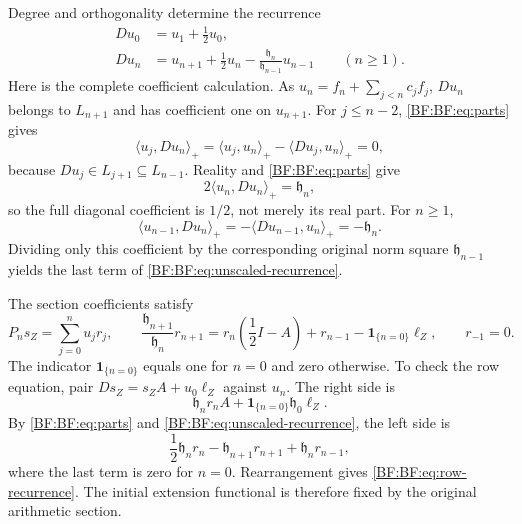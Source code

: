 Degree and orthogonality determine the recurrence
\begin{equation}
\begin{split}
Du_0&=u_1+\frac12u_0,\\
Du_n&=u_{n+1}+\frac12u_n
          -\frac{\mathfrak h_n}{\mathfrak h_{n-1}}u_{n-1}
          \qquad(n\ge1).
\end{split}
\tag{BF.14}\label{BF:BF:eq:unscaled-recurrence}
\end{equation}
Here is the complete coefficient calculation.  As
\(u_n=f_n+\sum_{j<n}c_jf_j\), \(Du_n\) belongs to \(L_{n+1}\)
and has coefficient one on \(u_{n+1}\).
For \(j\le n-2\), \eqref{BF:BF:eq:parts} gives
\[
\langle u_j,Du_n\rangle_+
=\langle u_j,u_n\rangle_+-\langle Du_j,u_n\rangle_+=0,
\]
because \(Du_j\in L_{j+1}\subseteq L_{n-1}\).
Reality and \eqref{BF:BF:eq:parts} give
\[
2\langle u_n,Du_n\rangle_+=\mathfrak h_n,
\]
so the full diagonal coefficient is \(1/2\), not merely its real
part.  For \(n\ge1\),
\[
\langle u_{n-1},Du_n\rangle_+
=-\langle Du_{n-1},u_n\rangle_+=-\mathfrak h_n.
\]
Dividing only this coefficient by the corresponding original norm
square \(\mathfrak h_{n-1}\) yields the last term of
\eqref{BF:BF:eq:unscaled-recurrence}.

The section coefficients satisfy
\begin{equation}
P_ns_Z=\sum_{j=0}^nu_jr_j,\qquad
\frac{\mathfrak h_{n+1}}{\mathfrak h_n}r_{n+1}
=r_n\left(\frac12I-A\right)+r_{n-1}
   -\mathbf 1_{\{n=0\}}\ell_Z,\qquad r_{-1}=0.
\tag{BF.15}\label{BF:BF:eq:row-recurrence}
\end{equation}
The indicator \(\mathbf 1_{\{n=0\}}\) equals one for \(n=0\)
and zero otherwise.  To check the row equation, pair
\(Ds_Z=s_ZA+u_0\ell_Z\) against \(u_n\).
The right side is
\[
\mathfrak h_nr_nA+\mathbf 1_{\{n=0\}}\mathfrak h_0\ell_Z.
\]
By \eqref{BF:BF:eq:parts} and \eqref{BF:BF:eq:unscaled-recurrence}, the
left side is
\[
\frac12\mathfrak h_nr_n-\mathfrak h_{n+1}r_{n+1}
+\mathfrak h_nr_{n-1},
\]
where the last term is zero for \(n=0\).  Rearrangement gives
\eqref{BF:BF:eq:row-recurrence}.  The initial extension functional is
therefore fixed by the original arithmetic section.


